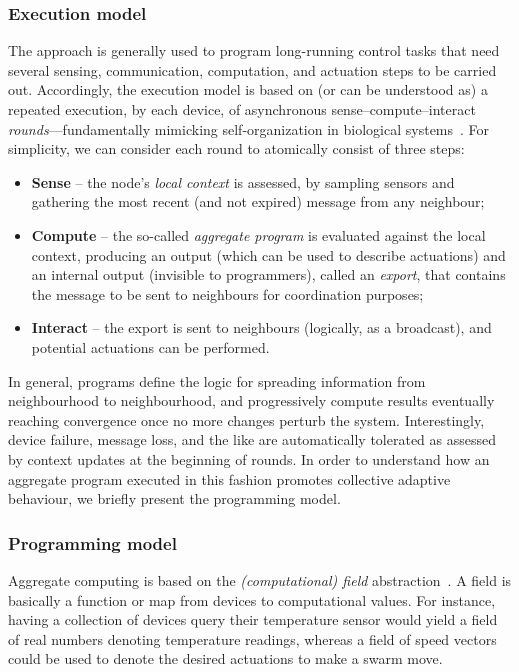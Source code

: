 \subsubsection{Execution model}
%
The approach is generally used to program long-running control tasks that need several sensing, communication, computation, and actuation steps to be carried out.
%
Accordingly, the execution model 
 is based on (or can be understood as) a repeated execution,
 by each device,
 of asynchronous sense--compute--interact \emph{rounds}---fundamentally mimicking self-organization in biological systems~\cite{bonabeau1999swarmintelligence-book}.
%
For simplicity, we can consider each round to atomically consist of three steps:
%
\begin{itemize}
\item \textbf{Sense} -- the node's \emph{local context} is assessed, by sampling sensors and gathering the most recent (and not expired) message from any neighbour;

\item \textbf{Compute} -- the so-called \emph{aggregate program} is evaluated against the local context, producing an output (which can be used to describe actuations) and an internal output (invisible to programmers), called an \emph{export}, that contains the message to be sent to neighbours for coordination purposes;

\item \textbf{Interact} -- the export is sent to neighbours (logically, as a broadcast), and potential actuations can be performed.
\end{itemize}
%
In general, programs define the logic for spreading information from neighbourhood to neighbourhood, and progressively compute results eventually reaching convergence once no more changes perturb the system.
% 
Interestingly, device failure, message loss, and the like are automatically tolerated as assessed by context updates at the beginning of rounds.
%
In order to understand how an aggregate program executed in this fashion promotes collective adaptive behaviour, we briefly present the programming model.

\subsubsection{Programming model}
%
Aggregate computing is based on the \emph{(computational) field} abstraction~\cite{Mamei:2004a}.
%
A field is basically a function or map from 
 devices to computational values.
%
For instance, 
 having a collection of devices
 query their temperature sensor
 would yield a field of real numbers denoting temperature readings,
 whereas a field of speed vectors 
 could be used to denote the desired actuations
 to make a swarm move.
%

